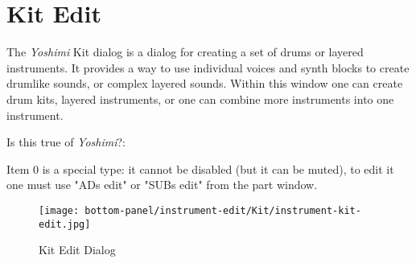 %
%
%

\section{Kit Edit}
\label{sec:kit_edit}

   The \textsl{Yoshimi} Kit dialog is a dialog for creating a
   set of drums or layered instruments.
   It provides a way to use individual voices and synth blocks to create
   drumlike sounds, or complex layered sounds.
   Within this window one can create drum kits, layered instruments, or one
   can combine more instruments into one instrument.  

   Is this true of \textsl{Yoshimi}?:

   Item 0 is a special type: it cannot be disabled (but it can be muted), to
   edit it one must use "ADs edit" or "SUBs edit" from the part window.

\begin{figure}[H]
   \centering 
   \texttt{[image: bottom-panel/instrument-edit/Kit/instrument-kit-edit.jpg]}
   \caption{Kit Edit Dialog}
   \label{fig:kit_edit_dialog}
\end{figure}

